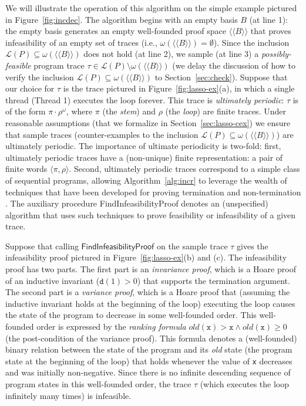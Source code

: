 \documentclass[9pt,nocopyrightspace]{sigplanconf}
\theoremstyle{definition}
\newcommand{\tuple}[1]{\langle #1 \rangle}
\newcommand{\closure}[1]{\langle\!\langle#1\rangle\!\rangle}
\newcommand{\lang}{\mathcal{L}}
\newcommand{\old}[1]{\textit{old}(#1)}
\begin{document}
We will illustrate the operation of this algorithm on the simple example
pictured in Figure~\ref{fig:incdec}.  The algorithm begins with an empty basis
$B$ (at line 1): the empty basis generates an empty well-founded proof space
$\closure{B}$ that proves infeasibility of an empty set of traces (i.e.,
$\omega(\closure{B}) = \emptyset$).  Since the inclusion $\lang(P) \subseteq
\omega(\closure{B})$ does not hold (at line 2), we sample (at line 3) a
\emph{possibly-feasible} program trace $\tau \in \lang(P) \setminus
\omega(\closure{B})$ (we delay the discussion of how to verify the inclusion
$\lang(P) \subseteq \omega(\closure{B})$ to Section~\ref{sec:check}).  Suppose
that our choice for $\tau$ is the trace pictured in
Figure~\ref{fig:lasso-ex}(a), in which a single thread (Thread 1) executes the
loop forever.  This trace is \emph{ultimately periodic}: $\tau$ is of the form
$\pi \cdot \rho^\omega$, where $\pi$ (the \emph{stem}) and $\rho$ (the
\emph{loop}) are finite traces.  Under reasonable assumptions (that we
formalize in Section~\ref{sec:lasso-cex}) we ensure that sample traces
(counter-examples to the inclusion $\lang(P) \subseteq \omega(\closure{B})$)
are ultimately periodic.  The importance of ultimate periodicity is two-fold:
first, ultimately periodic traces have a (non-unique) finite representation: a
pair of finite words $\tuple{\pi,\rho}$.  Second, ultimately periodic traces
correspond to a simple class of sequential programs, allowing
Algorithm~\ref{alg:incr} to leverage the wealth of techniques that have been
developed for proving termination
\cite{cav/BradleyMS05,vmcai/PodelskiR04,conf/atva/HeizmannHLP13} and
non-termination \cite{Gupta2008}.  The auxiliary procedure
\textsf{FindInfeasibilityProof} denotes an (unspecified) algorithm that uses
such techniques to prove feasibility or infeasibility of a given trace.

Suppose that calling $\textsf{FindInfeasibilityProof}$ on the sample trace
$\tau$ gives the infeasibility proof pictured in Figure~\ref{fig:lasso-ex}(b)
and (c).  The infeasibility proof has two parts.  The first part is an
\emph{invariance proof}, which is a Hoare proof of an inductive invariant
(\mbox{\color{mygreen}$\texttt{d}(1) > 0$}) that supports the termination
argument.  The second part is a \emph{variance proof}, which is a Hoare proof
that (assuming the inductive invariant holds at the beginning of the loop)
executing the loop causes the state of the program to decrease in some
well-founded order.  This well-founded order is expressed by the \emph{ranking
  formula} {\color{purple}$\old{\texttt{x}} > \texttt{x} \land
  \old{\texttt{x}} \geq 0$} (the post-condition of the variance proof).  This
formula denotes a (well-founded) binary relation between the state of the
program and its \emph{old} state (the program state at the beginning of the
loop) that holds whenever the value of \texttt{x} decreases and was initially
non-negative.  Since there is no infinite descending sequence of program
states in this well-founded order, the trace $\tau$ (which executes the loop
infinitely many times) is infeasible.
\end{document}
